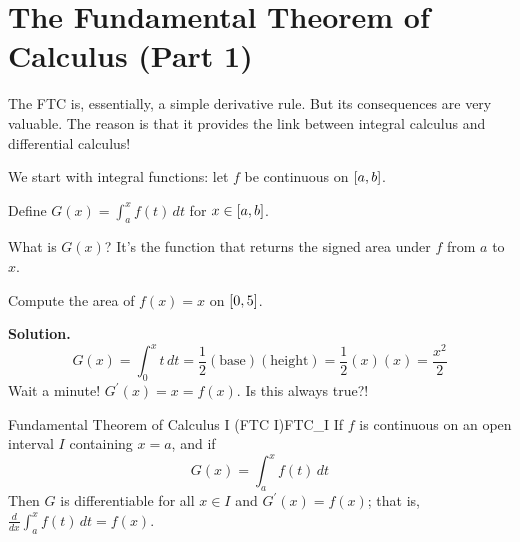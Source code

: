 \section{The Fundamental Theorem of Calculus (Part 1)}
The FTC is, essentially, a simple derivative rule. But
its consequences are very valuable. The reason is that it
provides the link between integral calculus and
differential calculus!

We start with integral functions: let $ f $ be
continuous on $ \interval{a}{b} $.

Define
$ \displaystyle G(x)=\int_{a}^{x} f(t)\, d{t} $
for $ x\in\interval{a}{b} $.

What is $ G(x) $? It's the function that returns the signed
area under $ f $ from $ a $ to $ x $.

\begin{Example}{}{}
    Compute the area of $ f(x)=x $ on $ \interval{0}{5} $.

    \textbf{Solution.}
    \[
        G(x)
        =\int_{0}^{x} t\, d{t}
        =\frac{1}{2}(\text{base})(\text{height})
        =\frac{1}{2}(x)(x)
        =\frac{x^2}{2}
    \]
    Wait a minute! $ G^\prime(x)=x=f(x) $. Is this always true?!
\end{Example}

\begin{Theorem}{Fundamental Theorem of Calculus I (FTC I)}{FTC_I}
    If $ f $ is continuous on an open interval $ I $ containing
    $ x=a $, and if
    \[ G(x)=\int_{a}^{x} f(t)\, d{t}  \]
    Then $ G $ is differentiable for all $ x\in I $ and
    $ G^\prime(x)=f(x) $; that is,
    $ \displaystyle \frac{d}{dx}\int_{a}^{x} f(t)\, d{t}=f(x) $.
\end{Theorem}

